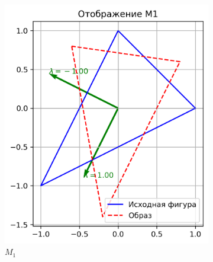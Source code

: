 \begin{figure}[H]
  \centering
  \begin{subfigure}[b]{0.3\textwidth}
    \includegraphics[width=\linewidth]{plots/M1.png}
    \caption{$M_1$}
  \end{subfigure}\hfill
  \begin{subfigure}[b]{0.3\textwidth}

\end{subfigure}
\end{figure}
